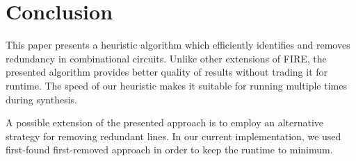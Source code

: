 \documentclass[conference]{IEEEtran} \usepackage{times}
\begin{document}
\section{Conclusion}
\label{con}

This paper presents a heuristic algorithm which efficiently
identifies and removes redundancy in combinational circuits. Unlike
other extensions of FIRE, the presented algorithm provides better quality of results
without trading it for runtime. The speed of our heuristic makes it
suitable for running multiple times during synthesis. 

A possible extension of the presented approach is to employ an alternative strategy
for removing redundant lines. In our current implementation, we used
first-found first-removed approach in order to keep the runtime to
minimum.




\end{document}
